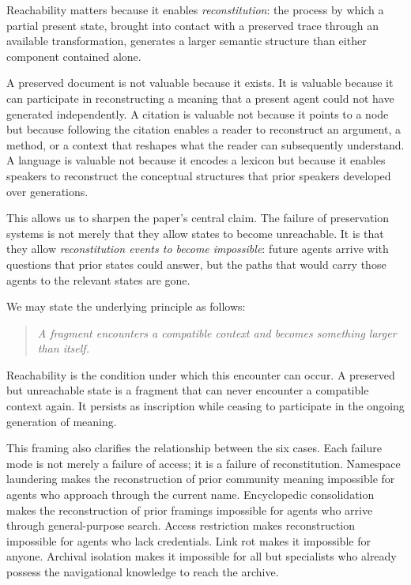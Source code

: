 \documentclass[12pt]{article}
\begin{document}
Reachability matters because it enables \emph{reconstitution}: the
process by which a partial present state, brought into contact with a
preserved trace through an available transformation, generates a larger
semantic structure than either component contained alone.

A preserved document is not valuable because it exists.
It is valuable because it can participate in reconstructing a meaning
that a present agent could not have generated independently.
A citation is valuable not because it points to a node but because
following the citation enables a reader to reconstruct an argument,
a method, or a context that reshapes what the reader can subsequently
understand.
A language is valuable not because it encodes a lexicon but because
it enables speakers to reconstruct the conceptual structures that prior
speakers developed over generations.

This allows us to sharpen the paper's central claim.
The failure of preservation systems is not merely that they allow states
to become unreachable.
It is that they allow \emph{reconstitution events to become impossible}:
future agents arrive with questions that prior states could answer, but
the paths that would carry those agents to the relevant states are gone.

We may state the underlying principle as follows:

\begin{quote}
\textit{A fragment encounters a compatible context and becomes something
larger than itself.}
\end{quote}

Reachability is the condition under which this encounter can occur.
A preserved but unreachable state is a fragment that can never encounter
a compatible context again.
It persists as inscription while ceasing to participate in the ongoing
generation of meaning.

This framing also clarifies the relationship between the six cases.
Each failure mode is not merely a failure of access; it is a failure
of reconstitution.
Namespace laundering makes the reconstruction of prior community meaning
impossible for agents who approach through the current name.
Encyclopedic consolidation makes the reconstruction of prior framings
impossible for agents who arrive through general-purpose search.
Access restriction makes reconstruction impossible for agents who lack
credentials.
Link rot makes it impossible for anyone.
Archival isolation makes it impossible for all but specialists who
already possess the navigational knowledge to reach the archive.
\end{document}
